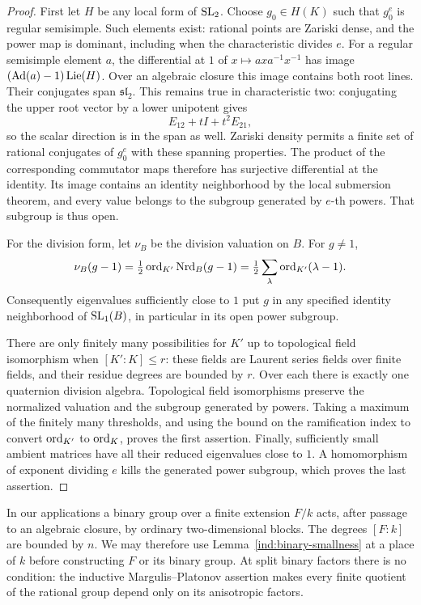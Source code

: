 \begin{proof}
First let $H$ be any local form of $\operatorname{SL}_2$.  Choose $g_0\in H(K)$ such
that $g_0^e$ is regular semisimple.  Such elements exist: rational points
are Zariski dense, and the power map is dominant, including when the
characteristic divides $e$.  For a regular semisimple element $a$, the
differential at $1$ of $x\mapsto axa^{-1}x^{-1}$ has image
$(\operatorname{Ad}(a)-1)\operatorname{Lie}(H)$.  Over an algebraic closure this image
contains both root lines.  Their conjugates span $\mathfrak{sl}_2$.
This remains true in characteristic two: conjugating the upper root
vector by a lower unipotent gives
\[
 E_{12}+tI+t^2E_{21},
\]
so the scalar direction is in the span as well.  Zariski density permits
a finite set of rational conjugates of $g_0^e$ with these spanning
properties.  The product of the corresponding commutator maps therefore
has surjective differential at the identity.  Its image contains an
identity neighborhood by the local submersion theorem, and every value
belongs to the subgroup generated by $e$-th powers.  That subgroup is
thus open.

For the division form, let $\nu_B$ be the division valuation on $B$.
For $g\ne1$,
\[
 \nu_B(g-1)=\tfrac12\operatorname{ord}_{K'}\operatorname{Nrd}_B(g-1)
           =\tfrac12\sum_\lambda\operatorname{ord}_{K'}(\lambda-1).
\]
Consequently eigenvalues sufficiently close to $1$ put $g$ in any
specified identity neighborhood of $\operatorname{SL}_1(B)$, in particular in its
open power subgroup.

There are only finitely many possibilities for $K'$ up to topological
field isomorphism when $[K':K]\leq r$: these fields are Laurent series
fields over finite fields, and their residue degrees are bounded by
$r$.  Over each there is exactly one quaternion division algebra.
Topological field isomorphisms preserve the normalized valuation and
the subgroup generated by powers.  Taking a maximum of the finitely
many thresholds, and using the bound on the ramification index to
convert $\operatorname{ord}_{K'}$ to $\operatorname{ord}_K$, proves the first assertion.
Finally, sufficiently small ambient matrices have all their reduced
eigenvalues close to $1$.  A homomorphism of exponent dividing $e$
kills the generated power subgroup, which proves the last assertion.
\end{proof}

In our applications a binary group over a finite extension $F/k$ acts,
after passage to an algebraic closure, by ordinary two-dimensional
blocks.  The degrees $[F:k]$ are bounded by $n$.  We may therefore use
Lemma~\ref{ind:binary-smallness} at a place of $k$ before constructing
$F$ or its binary group.  At split binary factors there is no condition:
the inductive Margulis--Platonov assertion makes every finite quotient
of the rational group depend only on its anisotropic factors.

